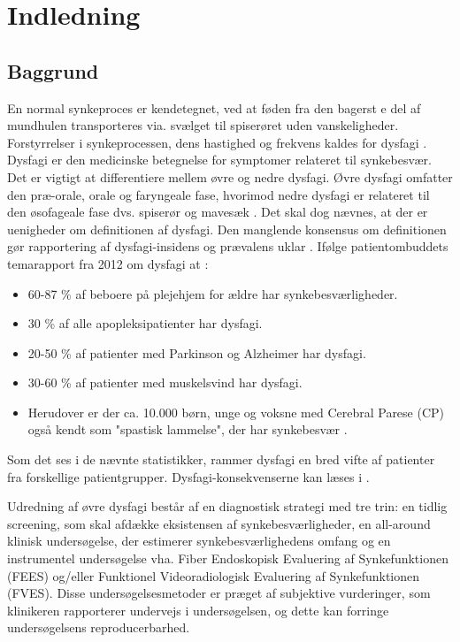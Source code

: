 \chapter{Indledning}

\section{Baggrund}
En normal synkeproces er kendetegnet, ved at føden  fra den bagerst e del af mundhulen transporteres via. svælget til spiserøret uden vanskeligheder. Forstyrrelser i synkeprocessen, dens hastighed og frekvens kaldes for dysfagi \cite{Sundhedsstyrelsen2015}. Dysfagi er den medicinske betegnelse for symptomer  relateret til synkebesvær. Det er vigtigt at differentiere mellem øvre og nedre dysfagi. Øvre dysfagi omfatter den præ-orale, orale og faryngeale fase, hvorimod nedre dysfagi er relateret til den øsofageale fase dvs. spiserør og mavesæk  \cite{Kjaersgaard2013}. Det skal dog nævnes, at der er uenigheder om definitionen af dysfagi. Den manglende konsensus om definitionen gør rapportering af dysfagi-insidens og prævalens uklar \cite{Kjaersgaard2013}. Ifølge patientombuddets temarapport fra 2012 om dysfagi at \cite{Bommersholdt2012}:

\begin{itemize}
\item 60-87 \% af beboere på plejehjem for ældre har synkebesværligheder.
\item 30 \% af alle apopleksipatienter har dysfagi.
\item 20-50 \% af patienter med Parkinson og Alzheimer har dysfagi.
\item 30-60 \% af patienter med muskelsvind har dysfagi.
\item Herudover er der ca. 10.000 børn, unge og voksne med Cerebral Parese (CP) også kendt som "spastisk lammelse", der har synkebesvær . 
\end{itemize}

Som det ses i de nævnte statistikker, rammer dysfagi en bred vifte af patienter fra forskellige patientgrupper. Dysfagi-konsekvenserne kan læses i . 

Udredning af øvre dysfagi består af en diagnostisk strategi med tre trin: en tidlig screening, som skal afdække eksistensen af synkebesværligheder, en all-around klinisk undersøgelse, der estimerer synkebesværlighedens omfang og en instrumentel undersøgelse vha. Fiber Endoskopisk Evaluering af Synkefunktionen (FEES) og/eller Funktionel Videoradiologisk Evaluering af Synkefunktionen (FVES). Disse undersøgelsesmetoder er præget af subjektive vurderinger, som klinikeren rapporterer undervejs i undersøgelsen, og dette kan forringe undersøgelsens reproducerbarhed.

